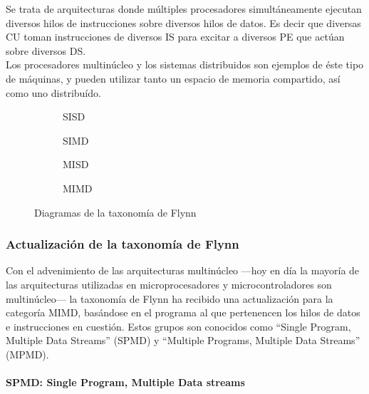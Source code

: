 Se trata de arquitecturas donde múltiples procesadores simultáneamente ejecutan 
diversos hilos de instrucciones sobre diversos hilos de datos. Es decir que 
diversas CU toman instrucciones de diversos IS para excitar a diversos PE que 
actúan sobre diversos DS.\\
Los procesadores multinúcleo y los sistemas distribuidos son ejemplos de éste 
tipo de máquinas, y pueden utilizar tanto un espacio de memoria compartido, así 
como uno distribuído.
\begin{figure}
  \begin{subfigure}{0.35\textwidth}
    
    \caption{SISD}
    \label{fig:sisd}
  \end{subfigure}
  \begin{subfigure}{0.35\textwidth}
    
    \caption{SIMD}
    \label{fig:simd}
  \end{subfigure}
  \begin{subfigure}{0.35\textwidth}
    
    \caption{MISD}
    \label{fig:misd}
  \end{subfigure}
  \begin{subfigure}{0.35\textwidth}
    
    \caption{MIMD}
    \label{fig:mimd}
  \end{subfigure}
  \caption{Diagramas de la taxonomía de Flynn}
  \label{fig:flynn_taxonomy}
\end{figure}

\subsubsection{Actualización de la taxonomía de Flynn}
\label{subsubsec:theory-modern-flynn_taxonomy-today}

Con el advenimiento de las arquitecturas multinúcleo ---hoy en día la mayoría 
de las arquitecturas utilizadas en microprocesadores y microcontroladores son 
multinúcleo--- la taxonomía de Flynn ha recibido una actualización para la 
categoría MIMD, basándose en el programa al que pertenencen los hilos de datos 
e instrucciones en cuestión. Estos grupos son conocidos como ``Single Program, 
Multiple Data Streams'' (SPMD) y ``Multiple Programs, Multiple Data Streams'' 
(MPMD).

\paragraph{SPMD: Single Program, Multiple Data streams}
\label{par:theory-modern-flynn_taxonomy-today-SPMD}

